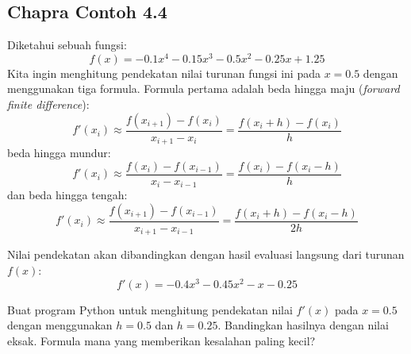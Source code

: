\subsection{Chapra Contoh 4.4}
Diketahui sebuah fungsi:
\begin{equation}
f(x) = -0.1x^4 - 0.15x^3 - 0.5x^2 - 0.25x + 1.25
\end{equation}
Kita ingin menghitung pendekatan nilai turunan fungsi ini pada $x=0.5$ dengan menggunakan tiga formula.
Formula pertama adalah beda hingga maju (\textit{forward finite difference}):
\begin{equation}
f'(x_{i}) \approx \frac{f(x_{i+1}) - f(x_{i})}{x_{i+1} - x_{i}} =
\frac{f(x_{i}+h) - f(x_{i})}{h}
\end{equation}
beda hingga mundur:
\begin{equation}
f'(x_{i}) \approx \frac{f(x_{i}) - f(x_{i-1})}{x_{i} - x_{i-1}} =
\frac{f(x_{i}) - f(x_{i}-h)}{h}
\end{equation}
dan beda hingga tengah:
\begin{equation}
f'(x_{i}) \approx \frac{f(x_{i+1}) - f(x_{i-1})}{x_{i+1} - x_{i-1}} =
\frac{f(x_{i}+h) - f(x_{i}-h)}{2h}
\end{equation}

Nilai pendekatan akan dibandingkan dengan hasil evaluasi langsung dari
turunan $f(x)$:
\begin{equation}
f'(x) = -0.4x^3 - 0.45x^2 - x - 0.25
\end{equation}

\begin{soal}
Buat program Python untuk menghitung pendekatan nilai $f'(x)$ pada $x=0.5$ dengan
menggunakan $h=0.5$ dan $h=0.25$. Bandingkan hasilnya dengan nilai eksak. Formula mana yang
memberikan kesalahan paling kecil?
\end{soal}